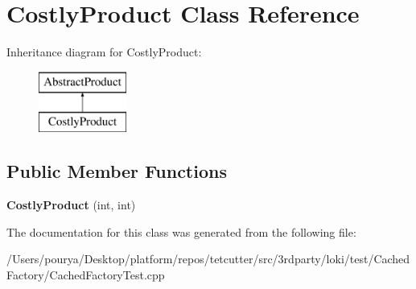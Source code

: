\hypertarget{classCostlyProduct}{}\section{Costly\+Product Class Reference}
\label{classCostlyProduct}
Inheritance diagram for Costly\+Product\+:\begin{figure}[H]
\begin{center}
\leavevmode
\includegraphics[height=2.000000cm]{classCostlyProduct}
\end{center}
\end{figure}
\subsection*{Public Member Functions}
\begin{DoxyCompactItemize}
\item 
\hypertarget{classCostlyProduct_a0f87a41a5153fa6e13e4505e707f4d6d}{}{\bfseries Costly\+Product} (int, int)\label{classCostlyProduct_a0f87a41a5153fa6e13e4505e707f4d6d}

\end{DoxyCompactItemize}


The documentation for this class was generated from the following file\+:\begin{DoxyCompactItemize}
\item 
/\+Users/pourya/\+Desktop/platform/repos/tetcutter/src/3rdparty/loki/test/\+Cached\+Factory/Cached\+Factory\+Test.\+cpp\end{DoxyCompactItemize}
